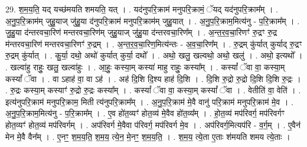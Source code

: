 \documentclass[17pt]{extarticle}
\begin{document}
29. श॒म॒य॒ति॒ यद् यच्छ॑मयति शमयति॒ यत् । . यद॑नुपरि॒क्राम॑ मनुपरि॒क्रामं॒ ॅयद् यद॑नुपरि॒क्राम᳚म् । . अ॒नु॒प॒रि॒क्राम॑म् जुहु॒याज् जु॑हु॒या द॑नुपरि॒क्राम॑ मनुपरि॒क्राम॑म् जुहु॒यात् । . अ॒नु॒प॒रि॒क्राम॒मित्य॑नु - प॒रि॒क्राम᳚म् । . जु॒हु॒या द॑न्तरवचा॒रिण॑ मन्तरवचा॒रिण॑म् जुहु॒याज् जु॑हु॒या द॑न्तरवचा॒रिण᳚म् । . अ॒न्त॒र॒व॒चा॒रिणꣳ॑ रु॒द्रꣳ रु॒द्र म॑न्तरवचा॒रिण॑ मन्तरवचा॒रिणꣳ॑ रु॒द्रम् । . अ॒न्त॒र॒व॒चा॒रिण॒मित्य॑न्तः - अ॒व॒चा॒रिण᳚म् । . रु॒द्रम् कु॑र्यात् कुर्याद् रु॒द्रꣳ रु॒द्रम् कु॑र्यात् । . कु॒र्या॒ दथो॒ अथो॑ कुर्यात् कुर्या॒ दथो᳚ । . अथो॒ खलु॒ खल्वथो॒ अथो॒ खलु॑ । . अथो॒ इत्यथो᳚ । . खल्वा॑हु राहुः॒ खलु॒ खल्वा॑हुः । . आ॒हुः॒ कस्या॒म् कस्या॑ माहु राहुः॒ कस्या᳚म् । . कस्यां᳚ ॅवा वा॒ कस्या॒म् कस्यां᳚ ॅवा । . वा ऽहाह॑ वा॒ वा ऽह॑ । . अह॑ दि॒शि दि॒श्य हाह॑ दि॒शि । . दि॒शि रु॒द्रो रु॒द्रो दि॒शि दि॒शि रु॒द्रः । . रु॒द्रः कस्या॒म् कस्याꣳ॑ रु॒द्रो रु॒द्रः कस्या᳚म् । . कस्यां᳚ ॅवा वा॒ कस्या॒म् कस्यां᳚ ॅवा । . वेतीति॑ वा॒ वेति॑ । . इत्य॑नुपरि॒क्राम॑ मनुपरि॒क्राम॒ मिती त्य॑नुपरि॒क्राम᳚म् । . अ॒नु॒प॒रि॒क्राम॑ मे॒वै वानु॑ परि॒क्राम॑ मनुपरि॒क्राम॑ मे॒व । . अ॒नु॒प॒रि॒क्राम॒मित्य॑नु - प॒रि॒क्राम᳚म् । . ए॒व हो॑त॒व्यꣳ॑ होत॒व्य॑ मे॒वैव हो॑त॒व्य᳚म् । . हो॒त॒व्य॑ मप॑रिवर्ग॒ मप॑रिवर्गꣳ होत॒व्यꣳ॑ होत॒व्य॑ मप॑रिवर्गम् । . अप॑रिवर्ग मे॒वैवा प॑रिवर्ग॒ मप॑रिवर्ग मे॒व । . अप॑रिवर्ग॒मित्यप॑रि - व॒र्ग॒म् । . ए॒वैन॑ मेन मे॒वै वैन᳚म् । . ए॒नꣳ॒॒ श॒म॒य॒ति॒ श॒म॒य॒ त्ये॒न॒ मे॒नꣳ॒॒ श॒म॒य॒ति॒ । . श॒म॒य॒ त्ये॒ता ए॒ताः श॑मयति शमय त्ये॒ताः । \newline
\end{document}
